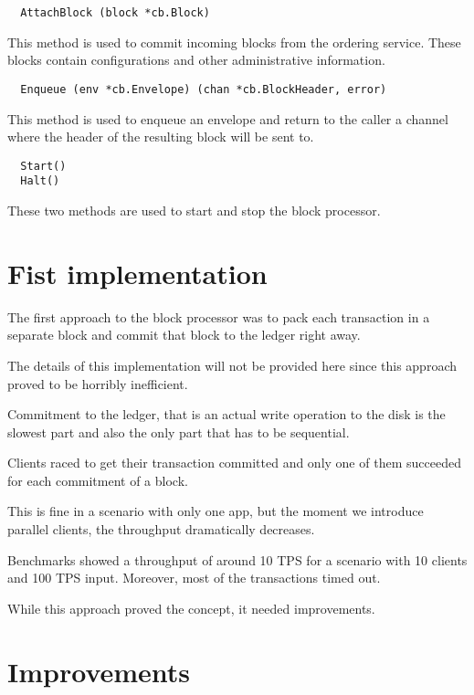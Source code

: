 \begin{lstlisting}
  AttachBlock (block *cb.Block)
\end{lstlisting}

This method is used to commit incoming blocks from the ordering service. These blocks contain configurations and other administrative information.

\begin{lstlisting}
  Enqueue (env *cb.Envelope) (chan *cb.BlockHeader, error)
\end{lstlisting}

This method is used to enqueue an envelope and return to the caller a channel where the header of the resulting block will be sent to.

\begin{lstlisting}
  Start()
  Halt()
\end{lstlisting}

These two methods are used to start and stop the block processor.

\section{Fist implementation}

The first approach to the block processor was to pack each transaction in a separate block and commit that block to the ledger right away.

The details of this implementation will not be provided here since this approach proved to be horribly inefficient.

Commitment to the ledger, that is an actual write operation to the disk is the slowest part and also the only part that has to be sequential.

Clients raced to get their transaction committed and only one of them succeeded for each commitment of a block.

This is fine in a scenario with only one app, but the moment we introduce parallel clients, the throughput dramatically decreases.

Benchmarks showed a throughput of around 10 TPS for a scenario with 10 clients and 100 TPS input. Moreover, most of the transactions timed out.

While this approach proved the concept, it needed improvements.

\section{Improvements}
\label{sec:bp-impr}

